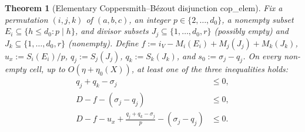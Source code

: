\documentclass[11pt,a4paper]{amsart}
\theoremstyle{plain}
\newtheorem{theorem}{Theorem}[section]
\theoremstyle{definition}
\theoremstyle{remark}
\begin{document}
\begin{theorem}[Elementary Coppersmith--B\'ezout disjunction \textsf{cop\_elem}]\label{thm:cop_elem}
Fix a permutation $(i,j,k)$ of $(a,b,c)$, an integer $p \in \{2,\dots,d_0\}$, a nonempty subset $E_i \subseteq \{h \le d_0 : p \mid h\}$, and divisor subsets $J_j \subseteq \{1,\dots,d_0,r\}$ (possibly empty) and $J_k \subseteq \{1,\dots,d_0,r\}$ (nonempty). Define $f := i_V - M_i(E_i) + M_j(J_j) + M_k(J_k)$, $u_x := S_i(E_i)/p$, $q_j := S_j(J_j)$, $q_k := S_k(J_k)$, and $s_0 := \sigma_j - q_j$. On every non-empty cell, up to $O(\eta + \eta_0(X))$, at least one of the three inequalities holds:
\begin{align}
  q_j + q_k - \sigma_j &\le 0, \label{eq:cop_deg} \\
  D - f - (\sigma_j - q_j) &\le 0, \label{eq:cop_b1} \\
  D - f - u_x + \frac{q_j + q_k - \sigma_j}{p} - (\sigma_j - q_j) &\le 0. \label{eq:cop_b2}
\end{align}
\end{theorem}
\end{document}
